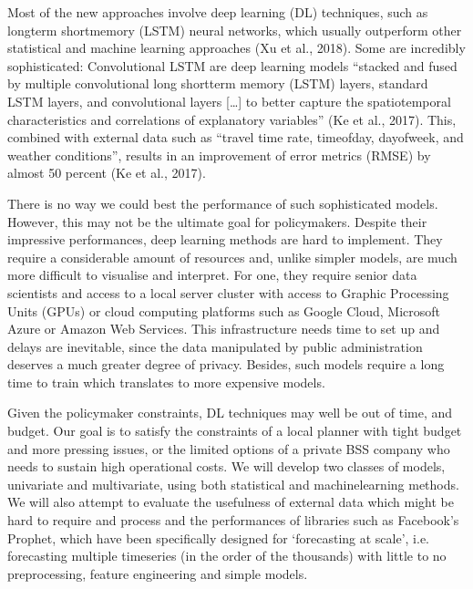 \documentclass[letterpaper,10pt,english]{jupyterBook}
\begin{document}
\sphinxAtStartPar
Most of the new approaches involve deep learning (DL) techniques, such as long\sphinxhyphen{}term short\sphinxhyphen{}memory (LSTM) neural networks, which usually outperform other statistical and machine learning approaches (Xu et al., 2018). Some are incredibly sophisticated: Convolutional LSTM are deep learning models “stacked and fused by multiple convolutional long short\sphinxhyphen{}term memory (LSTM) layers, standard LSTM layers, and convolutional layers {[}…{]} to better capture the spatio\sphinxhyphen{}temporal characteristics and correlations of explanatory variables” (Ke et al., 2017). This, combined with external data such as “travel time rate, time\sphinxhyphen{}of\sphinxhyphen{}day, day\sphinxhyphen{}of\sphinxhyphen{}week, and weather conditions”, results in an improvement of error metrics (RMSE) by almost 50 percent (Ke et al., 2017).

\sphinxAtStartPar
There is no way we could best the performance of such sophisticated models. However, this may not be the ultimate goal for policymakers. Despite their impressive performances, deep learning methods are hard to implement. They require a considerable amount of resources and, unlike simpler models, are much more difficult to visualise and interpret. For one, they require senior data scientists and access to a local server cluster with access to Graphic Processing Units (GPUs) or cloud computing platforms such as Google Cloud, Microsoft Azure or Amazon Web Services. This infrastructure needs time to set up and delays are inevitable, since the data manipulated by public administration deserves a much greater degree of privacy. Besides, such models require a long time to train \sphinxhyphen{} which translates to more expensive models.

\sphinxAtStartPar
Given the policymaker constraints, DL techniques may well be out of time, and budget. Our goal is to satisfy the constraints of a local planner with tight budget and more pressing issues, or the limited options of a private BSS company who needs to sustain high operational costs. We will develop two classes of models, univariate and multivariate, using both statistical and machine\sphinxhyphen{}learning methods. We will also attempt to evaluate the usefulness of external data \sphinxhyphen{} which might be hard to require and process \sphinxhyphen{} and the performances of libraries such as Facebook’s Prophet, which have been specifically designed for ‘forecasting at scale’, i.e. forecasting multiple time\sphinxhyphen{}series (in the order of the thousands) with little to no pre\sphinxhyphen{}processing, feature engineering and simple models.
\end{document}

